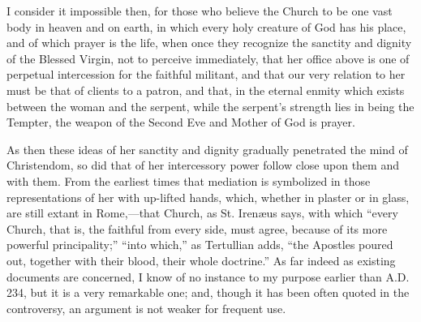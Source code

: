 I consider it impossible then, for those who believe the Church to be
one vast body in heaven and on earth, in which every holy creature of
God has his place, and of which prayer is the life, when once they
recognize the sanctity and dignity of the Blessed Virgin, not to
perceive immediately, that her office above is one of perpetual
intercession for the faithful militant, and that our very relation to
her must be that of clients to a patron, and that, in the eternal enmity
which exists between the woman and the serpent, while the serpent's
strength lies in being the Tempter, the weapon of the Second Eve and
Mother of God is prayer.

As then these ideas of her sanctity and dignity gradually penetrated
the mind of Christendom, so did that of her intercessory power follow
close upon them and with them. From the earliest times that mediation is
symbolized in those representations of her with up-lifted hands, which,
whether in plaster or in glass, are still extant in Rome,—that Church,
as St. Irenæus says, with which ``every Church, that is, the
faithful from every side, must agree, because of its more powerful
principality;'' ``into which,'' as Tertullian adds,
``the Apostles poured out, together with their blood, their whole
doctrine.'' As far indeed as existing documents are concerned, I
know of no instance to my purpose earlier than A.D. 234, but it is a
very remarkable one; and, though it has been often quoted in the
controversy, an argument is not weaker for frequent use.

